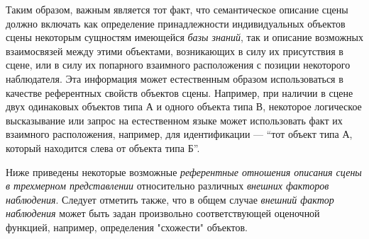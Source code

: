 Таким образом, важным является тот факт, что семантическое описание сцены должно включать как определение принадлежности индивидуальных объектов сцены некоторым сущностям имеющейся \textit{базы знаний}, так и описание возможных взаимосвязей между этими объектами, возникающих в силу их присутствия в сцене, или в силу их попарного взаимного расположения с позиции некоторого наблюдателя. Эта информация может естественным образом использоваться в качестве референтных свойств объектов сцены. Например, при наличии в сцене двух одинаковых объектов типа А и одного объекта типа В, некоторое логическое высказывание или запрос на естественном языке может использовать факт их взаимного расположения, например, для идентификации --- ``тот объект типа А, который находится слева от объекта типа Б''.


\begin{SCn}
\end{SCn}
\begin{SCn}
\end{SCn}
\begin{SCn}
\end{SCn}


Ниже приведены некоторые возможные \textit{референтные отношения описания сцены в трехмерном представлении} относительно различных \textit{внешних факторов наблюдения}. Следует отметить также, что в общем случае \textit{внешний фактор наблюдения} может быть задан произвольно соответствующей оценочной функцией, например, определения "схожести"{} объектов.

